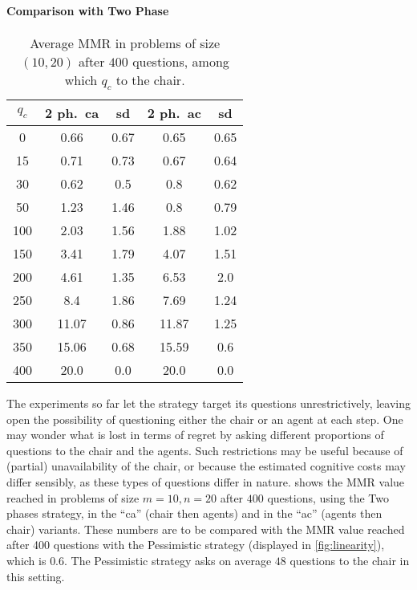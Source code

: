 \documentclass{article}
\begin{document}
\paragraph{Comparison with Two Phase}
\begin{table}
	\caption{Average MMR in problems of size $(10, 20)$ after $400$ questions, among which $q_c$ to the chair.}
	\label{tab:twoP400}
	\begin{tabular}{S[table-figures-integer=3, table-figures-decimal=0]S[table-number-alignment = right]@{ ± }S[table-number-alignment = left, table-figures-integer=1]S[table-number-alignment = right]@{ ± }S[table-number-alignment = left, table-figures-integer=1]}
		\toprule
		{$q_c$} & {2 ph.\ ca} & {sd} & {2 ph.\ ac} & {sd} \\
		 & 0.66 & 0.67 & 0.65 & 0.65  \\
		15 & 0.71 & 0.73 & 0.67	& 0.64 \\
		30 & 0.62 & 0.5 & 0.8 & 0.62 \\
		50 & 1.23 & 1.46 & 0.8 & 0.79 \\
		100 & 2.03 & 1.56 & 1.88 & 1.02  \\
		150 & 3.41 & 1.79 & 4.07 & 1.51 \\
		200 & 4.61	& 1.35  & 6.53 & 2.0  \\
		250 & 8.4 & 1.86 & 	7.69 & 1.24 \\
		300 &11.07 & 0.86& 11.87 & 1.25 \\
		350 &15.06 & 0.68&15.59 & 0.6 \\
		400 &20.0 & 0.0 & 20.0 & 0.0 \\
		\bottomrule
	\end{tabular}
\end{table}

The experiments so far let the strategy target its questions unrestrictively, leaving open the possibility of questioning either the chair or an agent at each step. One may wonder what is lost in terms of regret by asking different proportions of questions to the chair and the agents. Such restrictions may be useful because of (partial) unavailability of the chair, or because the estimated cognitive costs may differ sensibly, as these types of questions differ in nature. 
 shows the MMR value reached in problems of size $m = 10, n = 20$ after $400$ questions, using the Two phases strategy, in the “ca” (chair then agents) and in the “ac” (agents then chair) variants. These numbers are to be compared with the MMR value reached after 400 questions with the Pessimistic strategy (displayed in \cref{fig:linearity}), which is $0.6$.
The Pessimistic strategy asks on average $48$ questions to the chair in this setting.
\end{document}
